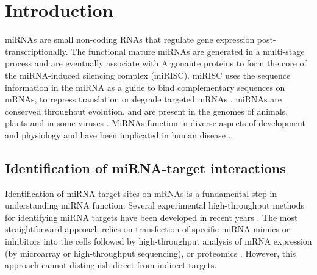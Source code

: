 \documentclass{bmcart}
\begin{document}
\section*{Introduction}
miRNAs are small non-coding RNAs that regulate gene expression post-transcriptionally. The functional mature miRNAs are generated in a multi-stage process \cite{finnegan2013microrna} and are eventually associate with Argonaute proteins to form the core of the miRNA-induced silencing complex (miRISC). miRISC uses the sequence information in the miRNA as a guide to bind complementary sequences on mRNAs, to repress  translation or degrade targeted mRNAs \cite{huntzinger2011gene}. 
miRNAs are conserved throughout evolution, and are present in the genomes of animals, plants and in some viruses \cite{kozomara2013mirbase}. MiRNAs function in diverse aspects of development and physiology and have been implicated in human disease \cite{rupaimoole2017microrna}.

\subsection*{Identification of miRNA-target interactions}
Identification of miRNA target sites on mRNAs is a fundamental step in understanding miRNA function.
Several experimental high-throughput methods for identifying miRNA targets have been developed in recent years \cite{li2019current, martinez2013microrna}.
The most straightforward approach relies on transfection of specific miRNA mimics or inhibitors into the cells followed by high-throughput analysis of mRNA expression (by microarray or high-throughput sequencing), or proteomics \cite{thomas2010desperately}. However, this approach cannot distinguish direct from indirect targets. 
\end{document}
